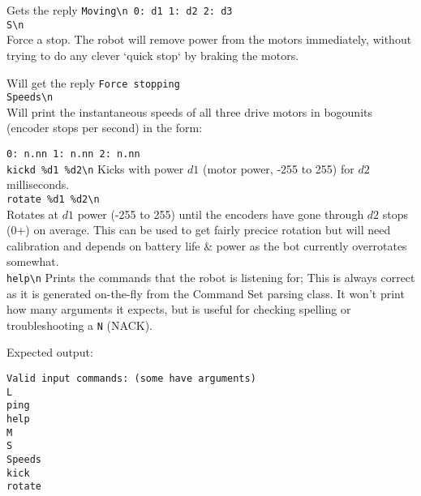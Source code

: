 Gets the reply \verb|Moving\n 0: d1 1: d2 2: d3|\\


\verb|S\n|\\
Force a stop. The robot will remove power from the motors immediately, without trying to do any clever `quick stop` by braking the motors.

Will get the reply \verb|Force stopping|\\


\verb|Speeds\n|\\
Will print the instantaneous speeds of all three drive motors in bogounits (encoder stops per second) in the form:

\verb|0: n.nn 1: n.nn 2: n.nn|\\


\verb|kickd %d1 %d2\n|
Kicks with power $d1$ (motor power, -255 to 255) for $d2$ milliseconds.\\


\verb|rotate %d1 %d2\n|\\
Rotates at $d1$ power (-255 to 255) until the encoders have gone through $d2$ stops (0+) on average. This can be used to get fairly precice rotation but will need calibration and depends on battery life \& power as the bot currently overrotates somewhat.\\


\verb|help\n|
Prints the commands that the robot is listening for; This is always correct as it is generated on-the-fly from the Command Set parsing class. It won't print how many arguments it expects, but is useful for checking spelling or troubleshooting a \texttt{N} (NACK).

Expected output:

\begin{verbatim}
Valid input commands: (some have arguments)
L
ping
help
M
S
Speeds
kick
rotate
\end{verbatim}
